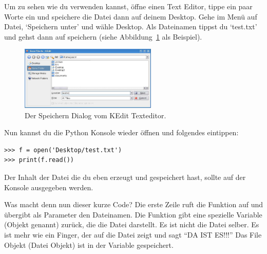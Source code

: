\begin{LINUX}
Um zu sehen wie du  verwenden kannst, öffne einen Text Editor, tippe ein paar Worte ein und speichere die Datei dann auf deinem Desktop. Gehe im Menü auf Datei, `Speichern unter' und wähle Desktop. Als Dateinamen tippst du `test.txt' und gehst dann auf speichern (siehe Abbildung~\ref{fig19} als Beispiel).

\begin{figure}
\begin{center}
\includegraphics[width=65mm]{images/figure19}
\end{center}
\caption{Der Speichern Dialog vom KEdit Texteditor.}\label{fig19}
\end{figure}

Nun kannst du die Python Konsole wieder öffnen und folgendes eintippen:

\begin{Verbatim}[frame=single]
>>> f = open('Desktop/test.txt')
>>> print(f.read())
\end{Verbatim}

Der Inhalt der Datei die du eben erzeugt und gespeichert hast, sollte auf der Konsole ausgegeben werden. %
\end{LINUX}

Was macht denn nun dieser kurze Code? Die erste Zeile ruft die Funktion  auf und übergibt als Parameter den Dateinamen. Die Funktion gibt eine spezielle Variable (Objekt genannt) zurück, die die Datei darstellt. Es ist nicht die Datei selber. Es ist mehr wie ein Finger, der auf die Datei zeigt und sagt ``DA IST ES!!!'' Das File Objekt (Datei Objekt) ist in der Variable  gespeichert.

